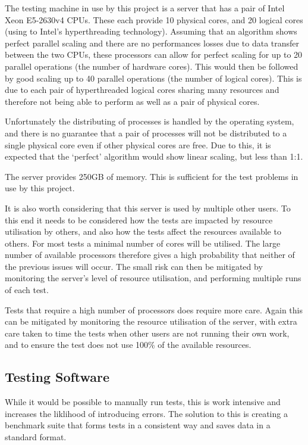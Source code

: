 The testing machine in use by this project is a server that has a pair of Intel Xeon E5-2630v4 CPUs. These each provide 10 physical cores, and 20 logical cores (using to Intel's hyperthreading technology). Assuming that an algorithm shows perfect parallel scaling and there are no performances losses due to data transfer between the two CPUs, these processors can allow for perfect scaling for up to 20 parallel operations (the number of hardware cores). This would then be followed by good scaling up to 40 parallel operations (the number of logical cores). This is due to each pair of hyperthreaded logical cores sharing many resources and therefore not being able to perform as well as a pair of physical cores. 

Unfortunately the distributing of processes is handled by the operating system, and there is no guarantee that a pair of processes will not be distributed to a single physical core even if other physical cores are free. Due to this, it is expected that the `perfect' algorithm would show linear scaling, but less than 1:1.

The server provides 250GB of memory. This is sufficient for the test problems in use by this project. 

It is also worth considering that this server is used by multiple other users. To this end it needs to be considered how the tests are impacted by resource utilisation by others, and also how the tests affect the resources available to others. For most tests a minimal number of cores will be utilised. The large number of available processors therefore gives a high probability that neither of the previous issues will occur. The small risk can then be mitigated by monitoring the server's level of resource utilisation, and performing multiple runs of each test.

Tests that require a high number of processors does require more care. Again this can be mitigated by monitoring the resource utilisation of the server, with extra care taken to time the tests when other users are not running their own work, and to ensure the test does not use 100\% of the available resources.

\subsection{Testing Software}
While it would be possible to manually run tests, this is work intensive and increases the liklihood of introducing errors. The solution to this is creating a benchmark suite that forms tests in a consistent way and saves data in a standard format. 

